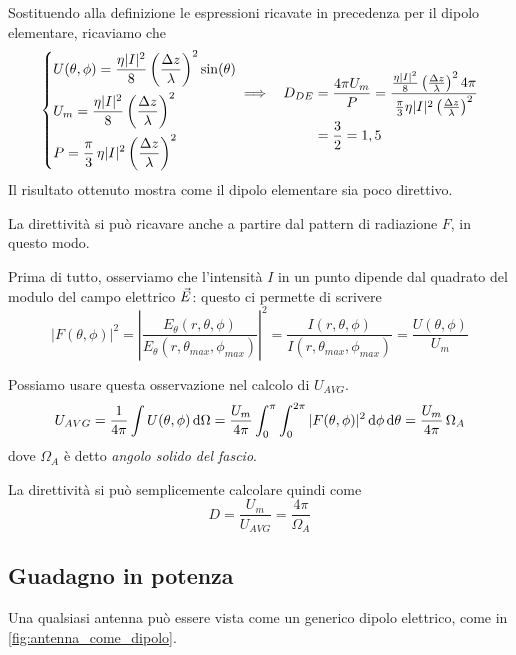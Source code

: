 Sostituendo alla definizione le espressioni ricavate in precedenza per il dipolo elementare, ricaviamo che
\begin{equation*}
	\begin{dcases}
		U(\theta,\phi) = \frac{\eta |I|^2}{8} \left(\frac{\Delta z}{\lambda}\right)^2 \sin(\theta) \\
		U_m = \frac{\eta |I|^2}{8} \left(\frac{\Delta z}{\lambda}\right)^2\\
		P = \frac{\pi}{3} \, \eta |I|^2 \left(\frac{\Delta z}{\lambda}\right)^2
	\end{dcases}
	\begin{split}
		\implies ~~ D_{DE}
		& = \frac{4\pi U_m}{P}
		= \frac{\frac{\eta |I|^2}{8} \left(\frac{\Delta z}{\lambda}\right)^2 4\pi}{\frac{\pi}{3}\eta |I|^2 \left(\frac{\Delta z}{\lambda}\right)^2} \\
		& = \frac{3}{2} = 1,5
	\end{split}
\end{equation*}
Il risultato ottenuto mostra come il dipolo elementare sia poco direttivo.

\bigbreak
La direttività si può ricavare anche a partire dal pattern di radiazione $F$, in questo modo.

Prima di tutto, osserviamo che l'intensità $I$ in un punto dipende dal quadrato del modulo del campo elettrico $\vec{E}$: questo ci permette di scrivere
\begin{equation*}
	|F(\theta, \phi)|^2
	= \left|\frac{E_\theta(r, \theta, \phi)}{E_\theta(r, \theta_{max}, \phi_{max})} \right|^2
	= \frac{I(r, \theta, \phi)}{I(r, \theta_{max}, \phi_{max})}
	= \frac{U(\theta, \phi)}{U_m}
\end{equation*}

Possiamo usare questa osservazione nel calcolo di $U_{AVG}$.
\begin{equation*}
	U_{AVG}
	= \frac{1}{4\pi} \int U(\theta, \phi) \mathop{}\!\mathrm{d} \Omega
	= \frac{U_m}{4\pi} \int_0^\pi \int_0^{2\pi} |F(\theta, \phi)|^2  \mathop{}\!\mathrm{d} \phi \mathop{}\!\mathrm{d} \theta
	= \frac{U_m}{4\pi} \, \Omega_A
\end{equation*}
dove $\Omega_A$ è detto \emph{angolo solido del fascio}.

La direttività si può semplicemente calcolare quindi come
\begin{equation} \label{eq:def_direttivita}
	D = \frac{U_m}{U_{AVG}} = \frac{4\pi}{\Omega_A}
\end{equation}

\subsection{Guadagno in potenza}
Una qualsiasi antenna può essere vista come un generico dipolo elettrico, come in \autoref{fig:antenna_come_dipolo}.

